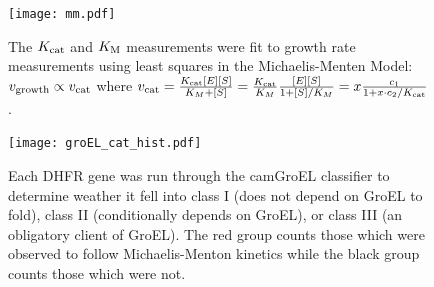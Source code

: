 \documentclass[a4paper,11pt]{article}
\begin{document}
\listoffigures
\newpage

\begin{figure}
\texttt{[image: mm.pdf]}
\caption[GroEL Classification Histogram]{The $K_{\rm cat}$ and $K_{\rm M}$ measurements were fit to growth rate measurements using least squares in the Michaelis-Menten Model: $v_{\rm growth}\propto v_{\rm cat}$ where $v_{\rm cat}=\frac{K_{\rm cat}[E][S]}{K_M+[S]}=\frac{K_{\rm cat}}{K_M}\frac{[E][S]}{1+[S]/K_M}=x\frac{c_1}{1+x\cdot c_2/K_{\rm cat}}$.}
\end{figure}
\begin{figure}
\texttt{[image: groEL\_cat\_hist.pdf]}
\caption[GroEL Classification Histogram]{Each DHFR gene was run through the camGroEL classifier to determine weather it fell into class I (does not depend on GroEL to fold), class II (conditionally depends on GroEL), or class III (an obligatory client of GroEL). The red group counts those which were observed to follow Michaelis-Menton kinetics while the black group counts those which were not.}
\end{figure}
\end{document}
